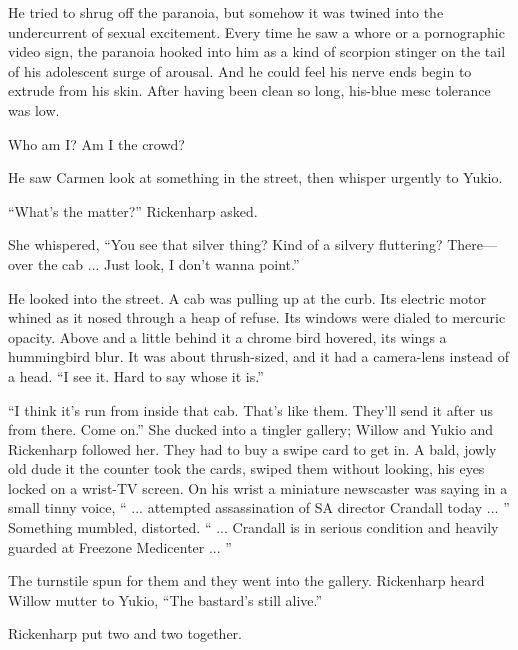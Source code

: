 He tried to shrug off the paranoia, but somehow it was twined into the undercurrent of sexual excitement. Every time he saw a whore or a pornographic video sign, the paranoia hooked into him as a kind of scorpion stinger on the tail of his adolescent surge of arousal. And he could feel his nerve ends begin to extrude from his skin. After having been clean so long, his-blue mesc tolerance was low.

Who am I? Am I the crowd?

He saw Carmen look at something in the street, then whisper urgently to Yukio.

``What's the matter?'' Rickenharp asked.

She whispered, ``You see that silver thing? Kind of a silvery fluttering? There—over the cab ... Just look, I don't wanna point.''

He looked into the street. A cab was pulling up at the curb. Its electric motor whined as it nosed through a heap of refuse. Its windows were dialed to mercuric opacity. Above and a little behind it a chrome bird hovered, its wings a hummingbird blur. It was about thrush-sized, and it had a camera-lens instead of a head. ``I see it. Hard to say whose it is.''

``I think it's run from inside that cab. That's like them. They'll send it after us from there. Come on.'' She ducked into a tingler gallery; Willow and Yukio and Rickenharp followed her. They had to buy a swipe card to get in. A bald, jowly old dude it the counter took the cards, swiped them without looking, his eyes locked on a wrist-TV screen. On his wrist a miniature newscaster was saying in a small tinny voice, `` ... attempted assassination of SA director Crandall today ... '' Something mumbled, distorted. `` ... Crandall is in serious condition and heavily guarded at Freezone Medicenter ... ''

The turnstile spun for them and they went into the gallery. Rickenharp heard Willow mutter to Yukio, ``The bastard's still alive.''

Rickenharp put two and two together.

